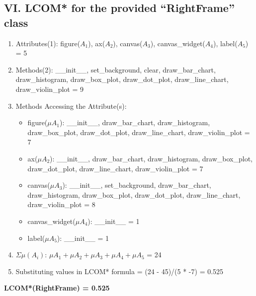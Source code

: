 \documentclass[english,12pt,a4paper]{report}
\begin{document}
	\subsection*{VI. LCOM* for the provided ``RightFrame'' class}
	\begin{enumerate}[label=\arabic*.]
		\item Attributes(1): figure(\(A_1\)), ax(\(A_2\)), canvas(\(A_3\)), canvas\_widget(\(A_4\)), label(\(A_5\)) = 5
		\item Methods(2): \_\_init\_\_, set\_background, clear, draw\_bar\_chart, draw\_histogram, draw\_box\_plot, draw\_dot\_plot, draw\_line\_chart, draw\_violin\_plot = 9
		\item Methods Accessing the Attribute(s):
		\begin{itemize}[label={$\bullet$}]
			\item figure(\(\mu A_1\)): \_\_init\_\_, draw\_bar\_chart, draw\_histogram, draw\_box\_plot, draw\_dot\_plot, draw\_line\_chart, draw\_violin\_plot = 7
			\item ax(\(\mu A_2\)): \_\_init\_\_, draw\_bar\_chart, draw\_histogram, draw\_box\_plot, draw\_dot\_plot, draw\_line\_chart, draw\_violin\_plot = 7
			\item canvas(\(\mu A_3\)): \_\_init\_\_, set\_background, draw\_bar\_chart, draw\_histogram, draw\_box\_plot, draw\_dot\_plot, draw\_line\_chart, draw\_violin\_plot = 8
			\item canvas\_widget(\(\mu A_4\)): \_\_init\_\_ = 1
			\item label(\(\mu A_5\)): \_\_init\_\_ = 1
		\end{itemize}
		\item \(\Sigma\mu(A_i)\): \(\mu A_1 + \mu A_2 + \mu A_3 + \mu A_4 + \mu A_5\) = 24
		\item Substituting values in LCOM* formula = (24 - 45)/(5 * -7) = 0.525
	\end{enumerate}
	\textbf{LCOM*(RightFrame) = 0.525}
	
\end{document}
